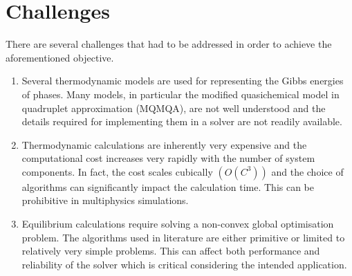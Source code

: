 \section{Challenges}
    There are several challenges that had to be addressed in order to achieve the aforementioned objective.
    \begin{enumerate}
        \item Several thermodynamic models are used for representing the Gibbs energies of phases. Many models, in particular the modified quasichemical model in quadruplet approximation (MQMQA), are not well understood and the details required for implementing them in a solver are not readily available.
        \item Thermodynamic calculations are inherently very expensive and the computational cost increases very rapidly with the number of system components. In fact, the cost  scales cubically $\left(\mathit{O}(C^3)\right)$ and the choice of algorithms can significantly impact the calculation time. This can be prohibitive in multiphysics simulations.
        \item Equilibrium calculations require solving a non-convex global optimisation problem. The algorithms used in literature are either primitive or limited to relatively very simple problems. This can affect both performance and reliability of the solver which is critical considering the intended application.
        \end{enumerate}

